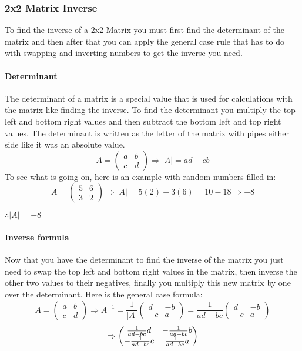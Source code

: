 \documentclass{article}
\begin{document}
\subsubsection{2x2 Matrix Inverse}
To find the inverse of a 2x2 Matrix you must first find the determinant of the matrix and then after that you can apply the general case rule that has to do with swapping and inverting numbers to get the inverse you need. 
\paragraph{Determinant}
The determinant of a matrix is a special value that is used for calculations with the matrix like finding the inverse. To find the determinant you multiply the top left and bottom right values and then subtract the bottom left and top right values. The determinant is written as the letter of the matrix with pipes either side like it was an absolute value.
\[
	A = 
	\begin{pmatrix}
		a & b\\
		c & d
	\end{pmatrix}
	\Rightarrow
	|A| = ad-cb	
\]
To see what is going on, here is an example with random numbers filled in:
\[
	A = 
	\begin{pmatrix}
		5 & 6\\
		3 & 2
	\end{pmatrix}
	\Rightarrow
	|A| = 5(2) - 3(6) = 10-18
	\Rightarrow
	-8
\]
\begin{center}\vspace{0.5cm}$\therefore |A| = -8$\end{center}

\paragraph{Inverse formula}
Now that you have the determinant to find the inverse of the matrix you just need to swap the top left and bottom right values in the matrix, then inverse the other two values to their negatives, finally you multiply this new matrix by one over the determinant. Here is the general case formula:
\[
	A = 
	\begin{pmatrix}
		a & b\\
		c & d
	\end{pmatrix}
	\Rightarrow
	A^{-1} = \frac{1}{|A|}
	\begin{pmatrix}
		d & -b\\
		-c & a
	\end{pmatrix}
	=
	\frac{1}{ad-bc}
	\begin{pmatrix}
		d & -b\\
		-c & a
	\end{pmatrix}
\]
\[
	\vspace{0.5cm}
	\Rightarrow
	\begin{pmatrix}
		\frac{1}{ad-bc}d & -\frac{1}{ad-bc}b\\
		-\frac{1}{ad-bc}c & \frac{1}{ad-bc}a
	\end{pmatrix}
\]
\end{document}

